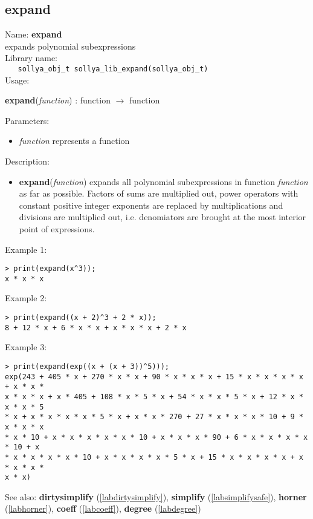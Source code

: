 \subsection{expand}
\label{labexpand}
\noindent Name: \textbf{expand}\\
\phantom{aaa}expands polynomial subexpressions\\[0.2cm]
\noindent Library name:\\
\verb|   sollya_obj_t sollya_lib_expand(sollya_obj_t)|\\[0.2cm]
\noindent Usage: 
\begin{center}
\textbf{expand}(\emph{function}) : \textsf{function} $\rightarrow$ \textsf{function}\\
\end{center}
Parameters: 
\begin{itemize}
\item \emph{function} represents a function
\end{itemize}
\noindent Description: \begin{itemize}

\item \textbf{expand}(\emph{function}) expands all polynomial subexpressions in function
   \emph{function} as far as possible. Factors of sums are multiplied out,
   power operators with constant positive integer exponents are replaced
   by multiplications and divisions are multiplied out, i.e. denomiators
   are brought at the most interior point of expressions.
\end{itemize}
\noindent Example 1: 
\begin{center}\begin{minipage}{15cm}\begin{Verbatim}[frame=single]
> print(expand(x^3));
x * x * x
\end{Verbatim}
\end{minipage}\end{center}
\noindent Example 2: 
\begin{center}\begin{minipage}{15cm}\begin{Verbatim}[frame=single]
> print(expand((x + 2)^3 + 2 * x));
8 + 12 * x + 6 * x * x + x * x * x + 2 * x
\end{Verbatim}
\end{minipage}\end{center}
\noindent Example 3: 
\begin{center}\begin{minipage}{15cm}\begin{Verbatim}[frame=single]
> print(expand(exp((x + (x + 3))^5)));
exp(243 + 405 * x + 270 * x * x + 90 * x * x * x + 15 * x * x * x * x + x * x * 
x * x * x + x * 405 + 108 * x * 5 * x + 54 * x * x * 5 * x + 12 * x * x * x * 5 
* x + x * x * x * x * 5 * x + x * x * 270 + 27 * x * x * x * 10 + 9 * x * x * x 
* x * 10 + x * x * x * x * x * 10 + x * x * x * 90 + 6 * x * x * x * x * 10 + x 
* x * x * x * x * 10 + x * x * x * x * 5 * x + 15 * x * x * x * x + x * x * x * 
x * x)
\end{Verbatim}
\end{minipage}\end{center}
See also: \textbf{dirtysimplify} (\ref{labdirtysimplify}), \textbf{simplify} (\ref{labsimplifysafe}), \textbf{horner} (\ref{labhorner}), \textbf{coeff} (\ref{labcoeff}), \textbf{degree} (\ref{labdegree})

